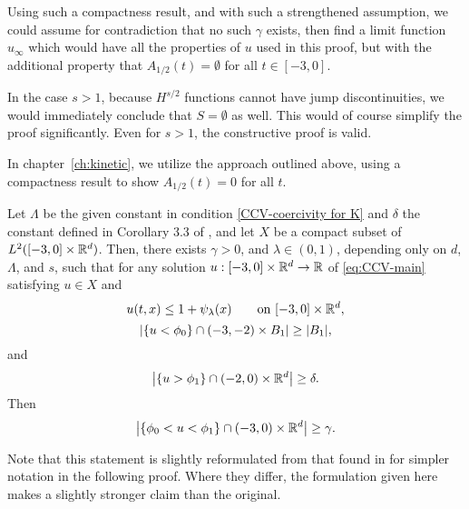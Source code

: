 Using such a compactness result, and with such a strengthened assumption, we could assume for contradiction that no such $\gamma$ exists, then find a limit function $u_\infty$ which would have all the properties of $u$ used in this proof, but with the additional property that $A_{1/2}(t) = \emptyset$ for all $t \in [-3,0]$.  

In the case $s > 1$, because $H^{s/2}$ functions cannot have jump discontinuities, we would immediately conclude that $S = \emptyset$ as well.  This would of course simplify the proof significantly.  Even for $s > 1$, the constructive proof is valid.  

In chapter~\ref{ch:kinetic}, we utilize the approach outlined above, using a compactness result to show $A_{1/2}(t) = 0$ for all $t$.  














\begin{lemma}
Let $\Lambda$ be the given constant in condition \eqref{CCV-coercivity for K} and $\delta$ the constant defined in Corollary 3.3 of \cite{CaChVa.nio}, and let $X$ be a compact subset of $L^2([-3,0]\times\mathbb{R}^d)$.  Then, there exists $\gamma > 0$, and $\lambda \in (0,1)$, depending only on $d$, $\Lambda$, and $s$, such that for any solution $u:[-3,0] \times \mathbb{R}^d \to \mathbb{R}$ of \eqref{eq:CCV-main} satisfying $u \in X$ and 
\begin{equation} \label{CCV-pointwise bound}
u(t,x) \leq 1 + \psi_\lambda(x) \qquad \textrm{on } [-3,0]\times\mathbb{R}^d, 
\end{equation}
\[ \left\lvert \{u < \phi_0\} \cap (-3,-2)\times B_1 \right\rvert \geq |B_1|, \]
and
\[ \left\lvert \{u > \phi_1\} \cap (-2,0)\times \mathbb{R}^d \right\rvert \geq \delta. \]
Then
\[ \left\lvert \{\phi_0 < u < \phi_1\} \cap (-3,0)\times \mathbb{R}^d \right\rvert \geq \gamma. \]
\end{lemma}
Note that this statement is slightly reformulated from that found in \cite{CaChVa.nio} for simpler notation in the following proof.  Where they differ, the formulation given here makes a slightly stronger claim than the original.  

